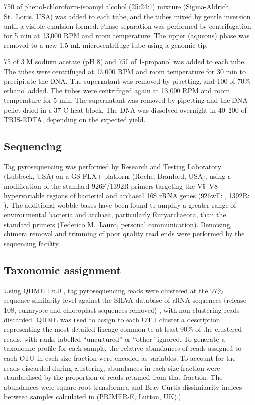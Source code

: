 750 \microlitre{} of phenol-chloroform-isoamyl alcohol (25:24:1) mixture (Sigma-Aldrich, St.\ Louis, USA) was added to each tube, and the tubes mixed by gentle inversion until a visible emulsion formed.
Phase separation was performed by centrifugation for 5 min at 13,000 RPM and room temperature.
The upper (aqueous) phase was removed to a new 1.5 mL microcentrifuge tube using a genomic tip.

75 \microlitre{} of 3 M sodium acetate (pH 8) and 750 \microlitre{} of 1-propanol was added to each tube.
The tubes were centrifuged at 13,000 RPM and room temperature for 30 min to precipitate the DNA.
The supernatant was removed by pipetting, and 100 \microlitre{} of 70\% ethanol added.
The tubes were centrifuged again at 13,000 RPM and room temperature for 5 min.
The supernatant was removed by pipetting and the DNA pellet dried in a 37 \textdegree{}C heat block.
The DNA was dissolved overnight in 40--200 \microlitre{} of TRIS-EDTA, depending on the expected yield.

\subsection{Sequencing}

Tag pyrosequencing was performed by Research and Testing Laboratory (Lubbock, USA) on a GS FLX+ platform (Roche, Branford, USA), using a modification of the standard 926F/1392R primers targeting the V6--V8 hypervariable regions of bacterial and archaeal 16S rRNA genes (926wF: , 1392R: ).
The additional wobble bases have been found to amplify a greater range of environmental bacteria and archaea, particularly Euryarchaeota, than the standard primers (Federico M.\ Lauro, personal communication).
Denoising, chimera removal and trimming of poor quality read ends were performed by the sequencing facility.

\subsection{Taxonomic assignment}

Using \ac{QIIME} 1.6.0 \cite{Caporaso:2010ts}, tag pyrosequencing reads were clustered at the 97\% sequence similarity level against the SILVA database of rRNA sequences (release 108, eukaryote and chloroplast sequences removed) \cite{Quast:2013hk}, with non-clustering reads discarded.
\ac{QIIME} was used to assign to each \ac{OTU} cluster a description representing the most detailed lineage common to at least 90\% of the clustered reads, with ranks labelled ``uncultured'' or ``other'' ignored.
To generate a taxonomic profile for each sample, the relative abundances of reads assigned to each \ac{OTU} in each size fraction were encoded as variables.
To account for the reads discarded during clustering, abundances in each size fraction were standardised by the proportion of reads retained from that fraction.
The abundances were square root transformed and Bray-Curtis dissimilarity indices between samples calculated in  (PRIMER-E, Lutton, UK).)

